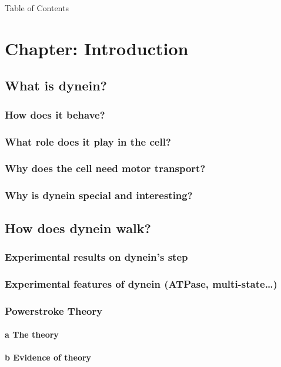 \documentclass[10pt]{article} %
\begin{document}
\newpage
\tableofcontents

\newpage

Table of Contents


\section{Chapter: Introduction}
	\subsection{What is dynein?}
		\subsubsection{How does it behave?}
		\subsubsection{What role does it play in the cell?}
		\subsubsection{Why does the cell need motor transport?}
		\subsubsection{Why is dynein special and interesting?}
	\subsection{How does dynein walk?}
		\subsubsection{Experimental results on dynein’s step}
		\subsubsection{Experimental features of dynein (ATPase, multi-state…)}
		\subsubsection{Powerstroke Theory}
		    \paragraph{a The theory}
		    \paragraph{b Evidence of theory}
\end{document}
